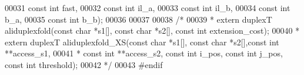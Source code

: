 \begin{DoxyCode}
00031                             \textcolor{keyword}{const} \textcolor{keywordtype}{int}   fast,
00032                             \textcolor{keyword}{const} \textcolor{keywordtype}{int}   il\_a,
00033                             \textcolor{keyword}{const} \textcolor{keywordtype}{int}   il\_b,
00034                             \textcolor{keyword}{const} \textcolor{keywordtype}{int}   b\_a,
00035                             \textcolor{keyword}{const} \textcolor{keywordtype}{int}   b\_b);
00036 
00037 
00038 \textcolor{comment}{/*}
00039 \textcolor{comment}{ * extern duplexT aliduplexfold(const char *s1[], const char *s2[], const int extension\_cost);}
00040 \textcolor{comment}{ * extern duplexT aliduplexfold\_XS(const char *s1[], const char *s2[],const int **access\_s1,}
00041 \textcolor{comment}{ * const int **access\_s2, const int i\_pos, const int j\_pos, const int threshold);}
00042 \textcolor{comment}{ */}
00043 \textcolor{preprocessor}{#endif}
\end{DoxyCode}

